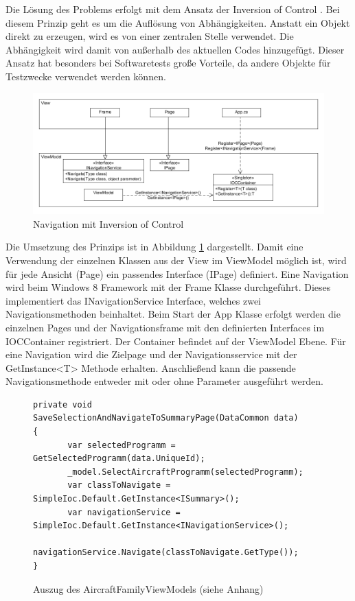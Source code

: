 Die Lösung des Problems erfolgt mit dem Ansatz der Inversion of Control \cite{bib:ioc}. Bei diesem Prinzip geht es um die Auflösung von Abhängigkeiten. Anstatt ein Objekt direkt zu erzeugen, wird es von einer zentralen Stelle verwendet. Die Abhängigkeit wird damit von außerhalb des aktuellen Codes hinzugefügt. Dieser Ansatz hat besonders bei Softwaretests große Vorteile, da andere Objekte für Testzwecke verwendet werden können.  \par
\begin{figure}[H]
\centering
\includegraphics[width=\hsize]{images/dependencyInjection}
\caption{Navigation mit Inversion of Control}
\label{ioc}
\end{figure}
Die Umsetzung des Prinzips ist in Abbildung \ref{ioc} dargestellt. Damit eine Verwendung der einzelnen Klassen aus der View im ViewModel möglich ist, wird für jede Ansicht (Page) ein passendes Interface (IPage) definiert. Eine Navigation wird beim Windows 8 Framework mit der Frame Klasse durchgeführt. Dieses implementiert das INavigationService Interface, welches zwei Navigationsmethoden beinhaltet. Beim Start der App Klasse erfolgt werden die einzelnen Pages und der Navigationsframe mit den definierten Interfaces im IOCContainer registriert. Der Container befindet auf der ViewModel Ebene. Für eine Navigation wird die Zielpage und der Navigationsservice mit der GetInstance<T> Methode erhalten. Anschließend kann die passende Navigationsmethode entweder mit oder ohne Parameter ausgeführt werden. \par 
\begin{figure}[H]
\begin{lstlisting}
private void SaveSelectionAndNavigateToSummaryPage(DataCommon data)
{
       var selectedProgramm = GetSelectedProgramm(data.UniqueId);
       _model.SelectAircraftProgramm(selectedProgramm);
       var classToNavigate = SimpleIoc.Default.GetInstance<ISummary>();
       var navigationService = SimpleIoc.Default.GetInstance<INavigationService>();
       navigationService.Navigate(classToNavigate.GetType());
}
\end{lstlisting}
\caption{Auszug des AircraftFamilyViewModels (siehe Anhang)}
\label{navigateMethod}
\end{figure}

